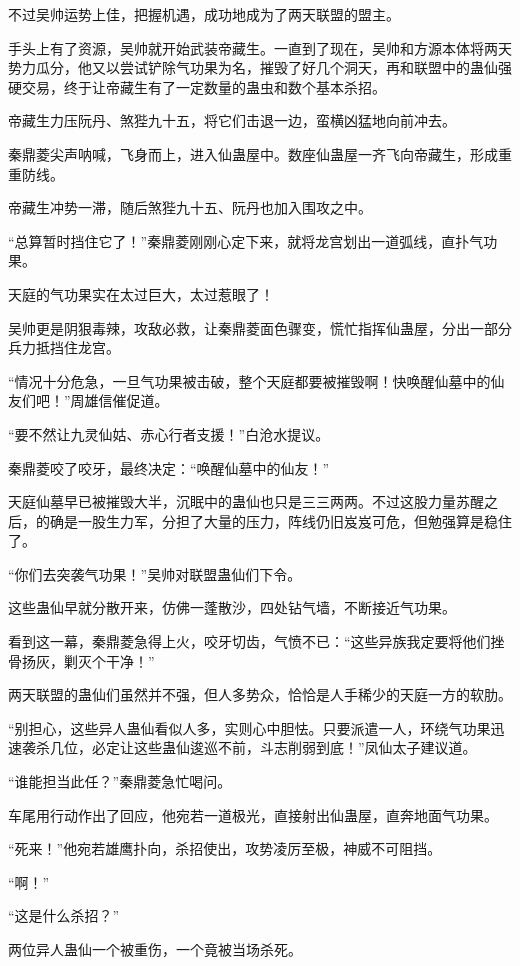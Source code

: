 \begin{this_body}
不过吴帅运势上佳，把握机遇，成功地成为了两天联盟的盟主。

手头上有了资源，吴帅就开始武装帝藏生。一直到了现在，吴帅和方源本体将两天势力瓜分，他又以尝试铲除气功果为名，摧毁了好几个洞天，再和联盟中的蛊仙强硬交易，终于让帝藏生有了一定数量的蛊虫和数个基本杀招。

帝藏生力压阮丹、煞狴九十五，将它们击退一边，蛮横凶猛地向前冲去。

秦鼎菱尖声呐喊，飞身而上，进入仙蛊屋中。数座仙蛊屋一齐飞向帝藏生，形成重重防线。

帝藏生冲势一滞，随后煞狴九十五、阮丹也加入围攻之中。

“总算暂时挡住它了！”秦鼎菱刚刚心定下来，就将龙宫划出一道弧线，直扑气功果。

天庭的气功果实在太过巨大，太过惹眼了！

吴帅更是阴狠毒辣，攻敌必救，让秦鼎菱面色骤变，慌忙指挥仙蛊屋，分出一部分兵力抵挡住龙宫。

“情况十分危急，一旦气功果被击破，整个天庭都要被摧毁啊！快唤醒仙墓中的仙友们吧！”周雄信催促道。

“要不然让九灵仙姑、赤心行者支援！”白沧水提议。

秦鼎菱咬了咬牙，最终决定：“唤醒仙墓中的仙友！”

天庭仙墓早已被摧毁大半，沉眠中的蛊仙也只是三三两两。不过这股力量苏醒之后，的确是一股生力军，分担了大量的压力，阵线仍旧岌岌可危，但勉强算是稳住了。

“你们去突袭气功果！”吴帅对联盟蛊仙们下令。

这些蛊仙早就分散开来，仿佛一蓬散沙，四处钻气墙，不断接近气功果。

看到这一幕，秦鼎菱急得上火，咬牙切齿，气愤不已：“这些异族我定要将他们挫骨扬灰，剿灭个干净！”

两天联盟的蛊仙们虽然并不强，但人多势众，恰恰是人手稀少的天庭一方的软肋。

“别担心，这些异人蛊仙看似人多，实则心中胆怯。只要派遣一人，环绕气功果迅速袭杀几位，必定让这些蛊仙逡巡不前，斗志削弱到底！”凤仙太子建议道。

“谁能担当此任？”秦鼎菱急忙喝问。

车尾用行动作出了回应，他宛若一道极光，直接射出仙蛊屋，直奔地面气功果。

“死来！”他宛若雄鹰扑向，杀招使出，攻势凌厉至极，神威不可阻挡。

“啊！”

“这是什么杀招？”

两位异人蛊仙一个被重伤，一个竟被当场杀死。


\end{this_body}
